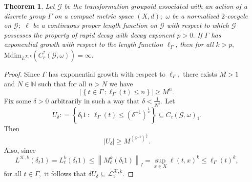 \documentclass[a4paper,11pt,reqno]{amsart}
\theoremstyle{plain}
\newtheorem{thm}{Theorem}[section]
\theoremstyle{mainthmstyle}
\theoremstyle{named}
\numberwithin{equation}{section}
\begin{document}
\begin{thm}\label{stratification_infinity}
Let $\mathcal G$ be the transformation groupoid associated with an action of a discrete group $\Gamma$ on a compact metric space $(X, d);$ $\omega$ be a normalized $2$-cocycle on $\mathcal{G};$ $\ell$ be a continuous proper length function on $\mathcal G$ with respect to which $\mathcal G$ possesses the property of rapid decay with decay exponent $p > 0.$ If $\Gamma$ has exponential growth with respect to the length function $\ell_{\Gamma}$, then for all $k > p,$ $\mathrm {Mdim}_{L^{\mathcal K, k}} \left (C_r^{\ast} (\mathcal G,\omega) \right ) = \infty.$
\end{thm}

\begin{proof}
Since $\Gamma$ has exponential growth with respect to $\ell_{\Gamma},$ there exists $M > 1$ and $N \in \mathbb N$ such that for all $n > N$ we have 
$$\left \lvert \left \{t \in \Gamma\ : \ell_{\Gamma} (t) \leq n \right \} \right \rvert \geq M^{n}.$$
Fix some $\delta > 0$ arbitrarily in such a way that $\delta < \frac {1} {N^{k}}.$ Let $$U_{\delta} : = \left \{\delta_t 1\ :\ \ell_{\Gamma} (t) \leq \left (\delta^{-1} \right )^{\frac {1} {k}} \right \} \subseteq C_c (\mathcal G, \omega)_1.$$ Then $$\left \lvert U_{\delta} \right \rvert \geq M^{\left (\delta^{-1} \right )^{\frac {1} {k}}}.$$ Also, since $$L^{\mathcal K, k} \left (\delta_{t} 1 \right ) = L_{\ell}^{k} \left (\delta_t 1 \right ) \leq \left \|M_{\ell}^{k} \left (\delta_{t} 1 \right ) \right \|_{I} = \sup\limits_{x \in X} \ell (t, x)^{k} \leq \ell_{\Gamma} (t)^{k},$$ for all $t \in \Gamma,$ it follows that $\delta U_{\delta} \subseteq \mathcal L_1^{\mathcal K, k}.$ 


\end{proof}
\end{document}
